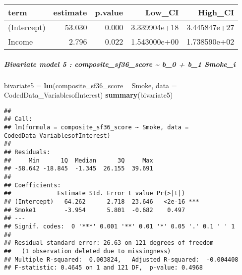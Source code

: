 \documentclass[]{article}
\newenvironment{Shaded}{\begin{snugshade}}{\end{snugshade}}
\newcommand{\DataTypeTok}[1]{\textcolor[rgb]{0.13,0.29,0.53}{#1}}
\newcommand{\DecValTok}[1]{\textcolor[rgb]{0.00,0.00,0.81}{#1}}
\newcommand{\FloatTok}[1]{\textcolor[rgb]{0.00,0.00,0.81}{#1}}
\newcommand{\KeywordTok}[1]{\textcolor[rgb]{0.13,0.29,0.53}{\textbf{#1}}}
\newcommand{\NormalTok}[1]{#1}
\newcommand{\OperatorTok}[1]{\textcolor[rgb]{0.81,0.36,0.00}{\textbf{#1}}}
\newcommand{\StringTok}[1]{\textcolor[rgb]{0.31,0.60,0.02}{#1}}
\let\oldsubparagraph\subparagraph
\renewcommand{\subparagraph}[1]{\oldsubparagraph{#1}\mbox{}}
\begin{document}
\begin{longtable}[]{@{}lrrrr@{}}
\toprule
term & estimate & p.value & Low\_CI & High\_CI\tabularnewline
\midrule
\endhead
(Intercept) & 53.030 & 0.000 & 3.339904e+18 &
3.445847e+27\tabularnewline
Income & 2.796 & 0.022 & 1.543000e+00 & 1.738590e+02\tabularnewline
\bottomrule
\end{longtable}

\hypertarget{bivariate-model-5-composite_sf36_score-b_0-b_1-smoke_i}{%
\subparagraph{Bivariate model 5 : composite\_sf36\_score
\textasciitilde{} b\_0 + b\_1
Smoke\_i}\label{bivariate-model-5-composite_sf36_score-b_0-b_1-smoke_i}}

\begin{Shaded}
\begin{Highlighting}[]
\NormalTok{bivariate5 =}\StringTok{ }\KeywordTok{lm}\NormalTok{(composite_sf36_score }\OperatorTok{~}\StringTok{ }\NormalTok{Smoke, }\DataTypeTok{data =}\NormalTok{ CodedData_VariablesofInterest)}
\KeywordTok{summary}\NormalTok{(bivariate5)}
\end{Highlighting}
\end{Shaded}

\begin{verbatim}
## 
## Call:
## lm(formula = composite_sf36_score ~ Smoke, data = CodedData_VariablesofInterest)
## 
## Residuals:
##     Min      1Q  Median      3Q     Max 
## -58.642 -18.845  -1.345  26.155  39.691 
## 
## Coefficients:
##             Estimate Std. Error t value Pr(>|t|)    
## (Intercept)   64.262      2.718  23.646   <2e-16 ***
## Smoke1        -3.954      5.801  -0.682    0.497    
## ---
## Signif. codes:  0 '***' 0.001 '**' 0.01 '*' 0.05 '.' 0.1 ' ' 1
## 
## Residual standard error: 26.63 on 121 degrees of freedom
##   (1 observation deleted due to missingness)
## Multiple R-squared:  0.003824,   Adjusted R-squared:  -0.004408 
## F-statistic: 0.4645 on 1 and 121 DF,  p-value: 0.4968
\end{verbatim}

\begin{Shaded}
\end{Shaded}
\end{document}
